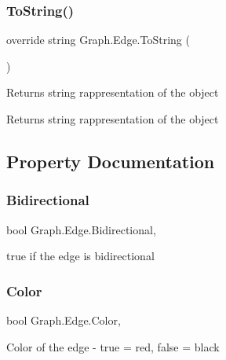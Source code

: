 \subsubsection{\texorpdfstring{To\+String()}{ToString()}}
{\footnotesize\ttfamily override string Graph.\+Edge.\+To\+String (\begin{DoxyParamCaption}{ }\end{DoxyParamCaption})}



Returns string rappresentation of the object 

\begin{DoxyReturn}{Returns}
string rappresentation of the object
\end{DoxyReturn}


\subsection{Property Documentation}
\mbox{\label{class_graph_1_1_edge_a26fcbf19716fd9202a8e995b305fad17}} 
\subsubsection{\texorpdfstring{Bidirectional}{Bidirectional}}
{\footnotesize\ttfamily bool Graph.\+Edge.\+Bidirectional\hspace{0.3cm}{\ttfamily [get]}, {\ttfamily [set]}}



true if the edge is bidirectional 

\mbox{\label{class_graph_1_1_edge_a01a68bb38bf2ea3498d9ff9be3b74338}} 
\subsubsection{\texorpdfstring{Color}{Color}}
{\footnotesize\ttfamily bool Graph.\+Edge.\+Color\hspace{0.3cm}{\ttfamily [get]}, {\ttfamily [set]}}



Color of the edge -\/ true = red, false = black 

\mbox{\label{class_graph_1_1_edge_aa8c3fe4814c4db91276161e22eb8a930}} 
